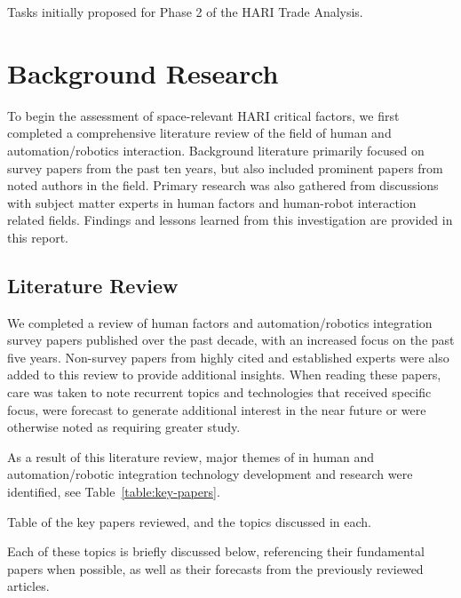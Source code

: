 \begin{table}[tb]
    \centering
    \caption[Tasks initially proposed for Phase 2 of the HARI Trade Analysis]{Tasks initially proposed for Phase 2 of the HARI Trade Analysis.}
    \label{table:phase2}
\end{table}

\section{Background Research}
To begin the assessment of space-relevant HARI critical factors, we first completed a comprehensive literature review of the field of human and automation/robotics interaction.
Background literature primarily focused on survey papers from the past ten years, but also included prominent papers from noted authors in the field.
Primary research was also gathered from discussions with subject matter experts in human factors and human-robot interaction related fields.
Findings and lessons learned from this investigation are provided in this report.

\subsection{Literature Review}
We completed a review of human factors and automation/robotics integration survey papers published over the past decade, with an increased focus on the past five years.
Non-survey papers from highly cited and established experts were also added to this review to provide additional insights.
When reading these papers, care was taken to note recurrent topics and technologies that received specific focus, were forecast to generate additional interest in the near future or were otherwise noted as requiring greater study.

As a result of this literature review, major themes of in human and automation/robotic integration technology development and research were identified, see Table~\ref{table:key-papers}.

\begin{table}[tb]
    \centering
    \caption[Table of the key papers reviewed]{Table of the key papers reviewed, and the topics discussed in each.}
    \label{table:key-papers}
\end{table}

Each of these topics is briefly discussed below, referencing their fundamental papers when possible, as well as their forecasts from the previously reviewed articles.

